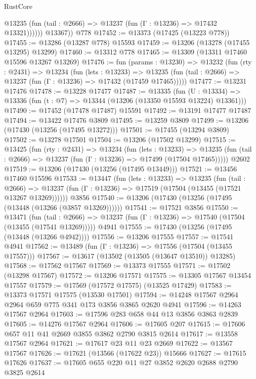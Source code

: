 \begin{lexlean}{RustCore}
\begin{coremodule}
              @13235 (fun (tail : @2666) => @13237 (fun (Γ : @13236) => @17432 @13321))))))
        @13367))
    @778
@17452 := @13373 (@17425 (@13223 @778))
@17455 := @13286 (@13287 @778) @15593
@17459 := @13206 (@13278 (@17455 @13295) @13299)
@17460 := @13312 @778
@17465 := @13309 (@13311 @17460 @15596 @13267 @13269)
@17476 := fun (params : @13230) =>
  @13232
    (fun (rty : @2431) =>
    @13234
      (fun (lets : @13233) =>
      @13235 (fun (tail : @2666) => @13237 (fun (Γ : @13236) => @17432 (@17459 @17465)))))
@17477 := @13231 @17476
@17478 := @13228 @17477
@17487 := @13335
    (fun (U : @13334) => @13336 (fun (t : @7) => @13344 (@13206 (@13350 @15593 @13224) @13361)))
@17490 := @17452 (@17478 @17487) @15591
@17492 := @13191 @17477 @17487
@17494 := @13422 @17476 @3809
@17495 := @13259 @3809
@17499 := @13206 (@17430 (@13256 (@17495 @13272)))
@17501 := @17455 (@13294 @3809)
@17502 := @13278 @17501
@17504 := @13206 (@17502 @13299)
@17515 := @13425
    (fun (rty : @2431) =>
    @13234
      (fun (lets : @13233) =>
      @13235 (fun (tail : @2666) => @13237 (fun (Γ : @13236) => @17499 (@17504 @17465)))))
    @2602
@17519 := @13206 (@17430 (@13256 (@17495 @13449)))
@17521 := @13456 @17460 @15596
@17533 := @13447
    (fun (lets : @13233) =>
    @13235
      (fun (tail : @2666) =>
      @13237 (fun (Γ : @13236) => @17519 (@17504 (@13455 (@17521 @13267 @13269))))))
    @3856
@17540 := @13206 (@17430 (@13256 (@17495 (@13448 (@13266 (@3857 @13269))))))
@17541 := @17521 @3856
@17550 := @13471
    (fun (tail : @2666) => @13237 (fun (Γ : @13236) => @17540 (@17504 (@13455 (@17541 @13269)))))
    @4941
@17555 := @17430 (@13256 (@17495 (@13448 (@13266 @4942))))
@17556 := @13206 @17555
@17557 := @17541 @4941
@17562 := @13489 (fun (Γ : @13236) => @17556 (@17504 (@13455 @17557)))
@17567 := @13617 (@13502 (@13505 (@13647 @13510)) @13285)
@17568 := @17562 @17567
@17569 := @13373 @17555
@17571 := @17502 (@13298 @17567)
@17572 := @13206 @17571
@17575 := @13305 @17567 @13454 @17557
@17579 := @17569 (@17572 @17575) (@13525 @17429)
@17583 := @13373 @17571 @17575 (@13530 @17501)
@17594 := @14248 @17567 @2964 @2964 @659 @775 @341 @173 @3856 @3865 @2620 @4941
@17596 := @14263 @17567 @2964
@17603 := @17596 @283 @658 @44 @13 @3856 @3863 @2839
@17605 := @14276 @17567 @2964
@17606 := @17605 @207
@17615 := @17606 @657 @11 @41 @2669 @3855 @3862 @2790 @3815 @2614
@17617 := @13558 @17567 @2964
@17621 := @17617 @23 @11 @23 @2669
@17622 := @13567 @17567
@17626 := @17621 (@13566 (@17622 @23)) @15666
@17627 := @17615 @17626
@17637 := @17605 @655 @220 @11 @27 @3852 @2620 @2688 @2790 @3825 @2614

\end{coremodule}
\end{lexlean}
